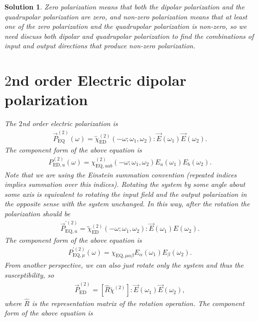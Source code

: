 \documentclass[UTF8,10pt,a4paper]{article}
\theoremstyle{Problem}
\theoremstyle{Solution}
\newtheorem*{sol}{Solution}
\begin{document}
\begin{sol}
    Zero polarization means that both the dipolar polarization and the quadrupolar polarization are zero, and non-zero polarization means that at least one of the zero polarization and the quadrupolar polarization is non-zero, so we need discuss both dipolar and quadrupolar polarization to find the combinations of input and output directions that produce non-zero polarization.
    \section{$2$nd order Electric dipolar polarization}
    The $2$nd order electric polarization is
    \begin{align}
        \vec{P}_{\text{EQ}}^{(2)}(\omega)=\overleftrightarrow{\chi}_{\text{ED}}^{(2)}(-\omega;\omega_1,\omega_2):\vec{E}(\omega_1)\vec{E}(\omega_2).
    \end{align}
    The component form of the above equation is
    \begin{align}
        P_{\text{ED},u}^{(2)}(\omega)=\chi_{\text{EQ},uab}^{(2)}(-\omega;\omega_1,\omega_2)E_a(\omega_1)E_b(\omega_2).
    \end{align}
    Note that we are using the Einstein summation convention (repeated indices implies summation over this indices).
    Rotating the system by some angle about some axis is equivalent to rotating the input field and the output polarization in the opposite sense with the system unchanged. In this way, after the rotation the polarization should be
    \begin{align}
        \vec{P}_{\text{EQ},u}^{'(2)}=\overleftrightarrow{\chi}_{\text{ED}}^{(2)}(-\omega;\omega_1,\omega_2):\vec{E}(\omega_1)E(\omega_2).
    \end{align}
    The component form of the above equation is
    \begin{align}
        \label{P-ED-1}
        P_{\text{EQ},\mu}^{'(2)}(\omega)=\chi_{\text{EQ},\mu\alpha\beta}E_{\alpha}(\omega_1)E_{\beta}(\omega_2).
    \end{align}
    From another perspective, we can also just rotate only the system and thus the susceptibility, so
    \begin{align}
        \vec{P}_{\text{ED}}^{(2)}=[\hat{R}\overleftrightarrow{\chi}^{(2)}]:\vec{E}(\omega_1)\vec{E}(\omega_2),
    \end{align}
    where $\hat{R}$ is the representation matrix of the rotation operation.
    The component form of the above equation is
    \begin{align}

\end{align}
\end{sol}
\end{document}
